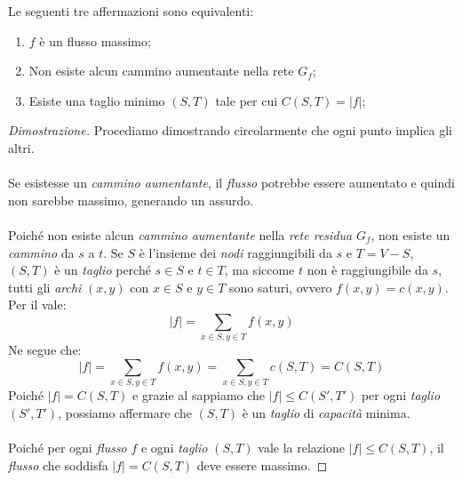 \begin{definition}
    Le seguenti tre affermazioni sono equivalenti:
    \begin{enumerate}
        \item $f$ è un flusso massimo;
        \item Non esiste alcun cammino aumentante nella rete $G_f$;
        \item Esiste una taglio minimo $(S,T)$ tale per cui $C(S,T)=|f|$;
    \end{enumerate}
\end{definition}

\begin{proof}[Dimostrazione]
    Procediamo dimostrando circolarmente che ogni punto implica gli altri.
    
    \paragraph{}
    Se esistesse un \emph{cammino aumentante}, il \emph{flusso} potrebbe essere
    aumentato e quindi non sarebbe massimo, generando un assurdo.

    \paragraph{}
    Poiché non esiste alcun \emph{cammino aumentante} nella \emph{rete residua}
    $G_f$, non esiste un \emph{cammino} da $s$ a $t$. Se $S$ è l'insieme dei
    \emph{nodi} raggiungibili da $s$ e $T=V-S$, $(S,T)$ è un \emph{taglio}
    perché $s\in S$ e $t\in T$, ma siccome $t$ non è raggiungibile da $s$,
    tutti gli \emph{archi} $(x,y)$ con $x\in S$ e $y\in T$ sono saturi, ovvero
    $f(x,y)=c(x,y)$. Per il \emph{} vale:
    \[|f|=\sum_{x\in S,y\in T}f(x,y)\]
    Ne segue che:
    \[|f|=\sum_{x\in S,y\in T}f(x,y)=\sum_{x\in S, y\in T}c(S,T)=C(S,T)\]
    Poiché $|f|=C(S,T)$ e grazie al \emph{} sappiamo che
    $|f|\leq C(S',T')$ per ogni \emph{taglio} $(S',T')$, possiamo affermare che
    $(S,T)$ è un \emph{taglio} di \emph{capacità} minima.

    \paragraph{}
    Poiché per ogni \emph{flusso} $f$ e ogni \emph{taglio} $(S,T)$ vale la
    relazione $|f|\leq C(S,T)$, il \emph{flusso} che soddisfa $|f|=C(S,T)$
    deve essere massimo.
\end{proof}

